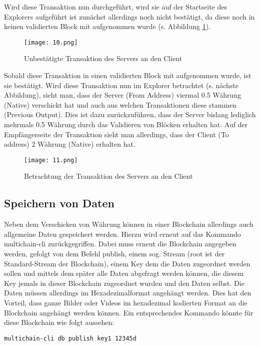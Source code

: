 Wird diese Transaktion nun durchgeführt, wird sie auf der Startseite des Explorers aufgeführt ist zunächst allerdings noch nicht bestätigt, da diese noch in keinen validierten Block mit aufgenommen wurde (s. Abbildung \ref{fig:10}).

\begin{figure}[h]
	\texttt{[image: 10.png]}
	\caption{Unbestätigte Transaktion des Servers an den Client}
	\label{fig:10}
\end{figure}

Sobald diese Transaktion in einen validierten Block mit aufgenommen wurde, ist sie bestätigt. Wird diese Transaktion nun im Explorer betrachtet (s. nächste Abbildung), sieht man, dass der Server (From Address) viermal 0.5 Währung (Native) verschickt hat und auch aus welchen Transaktionen diese stammen (Previous Output). Dies ist dazu zurückzuführen, dass der Server bislang lediglich mehrmals 0.5 Währung durch das Validieren von Blöcken erhalten hat. Auf der Empfängerseite der Transaktion sieht man allerdings, dass der Client (To address) 2 Währung (Native) erhalten hat.

\begin{figure}[h]
	\texttt{[image: 11.png]}
	\caption{Betrachtung der Transaktion des Servers an den Client}
	\label{fig:11}
\end{figure}

\subsection{Speichern von Daten}
Neben dem Verschicken von Währung können in einer Blockchain allerdings auch allgemeine Daten gespeichert werden. Hierzu wird erneut auf das Kommando multichain-cli zurückgegriffen. Dabei muss erneut die Blockchain angegeben werden, gefolgt von dem Befehl publish, einem sog. Stream (root ist der Standard-Stream der Blockchain), einem Key dem die Daten zugeordnet werden sollen und mittels dem später alle Daten abgefragt werden können, die diesem Key jemals in dieser Blockchain zugeordnet wurden und den Daten selbst. Die Daten müssen allerdings im Hexadezimalformat angehängt werden. Dies hat den Vorteil, dass ganze Bilder oder Videos im hexadezimal kodierten Format an die Blockchain angehängt werden können. Ein entsprechendes Kommando könnte für diese Blockchain wie folgt aussehen:

\begin{lstlisting}[frame=single]
multichain-cli db publish key1 12345d
\end{lstlisting} 

